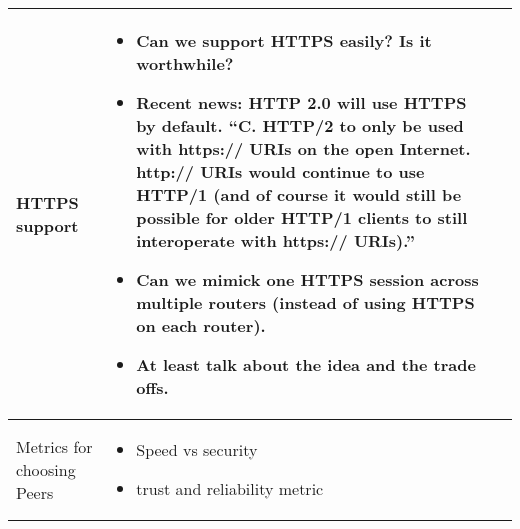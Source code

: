\documentclass[a4wide,10pt]{extarticle}
\begin{document}
\begin{center}
\begin{tabular}{| m{3.0cm} | m{12.6cm} | m{2cm}|}
HTTPS support &
	\begin{itemize}
		\item Can we support HTTPS easily? Is it worthwhile?
		\item Recent news: HTTP 2.0 will use HTTPS by default. ``C. HTTP/2 to only be used with https:// URIs on the open Internet. http:// URIs would continue to use HTTP/1 (and of course it would
still be possible for older HTTP/1 clients to still interoperate with https:// URIs).''
		\item Can we mimick one HTTPS session across multiple routers (instead of using HTTPS on each router).
		\item At least talk about the idea and the trade offs.
	\end{itemize}
\\ \hline

Metrics for choosing Peers &
	\begin{itemize}
		\item Speed vs security
		\item trust and reliability metric
	\end{itemize}
\\ \hline

\end{tabular}
\end{center}
\end{document}
